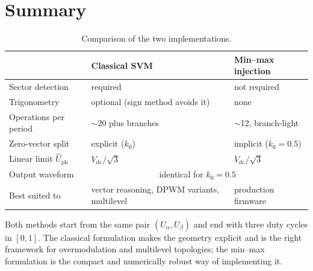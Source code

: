 \documentclass[11pt,a4paper]{article}
\newcommand{\vdc}{V_{\mathrm{dc}}}
\newcommand{\ualpha}{U_{\alpha}}
\newcommand{\ubeta}{U_{\beta}}
\begin{document}
\section{Summary}

\begin{table}[h]
\centering
\begin{tabular}{p{4.6cm}p{4.6cm}p{4.6cm}}
\toprule
& \textbf{Classical SVM} & \textbf{Min--max injection} \\
\midrule
Sector detection & required & not required \\
Trigonometry & optional (sign method avoids it) & none \\
Operations per period & $\sim$20 plus branches & $\sim$12, branch-light \\
Zero-vector split & explicit ($k_0$) & implicit ($k_0 = 0.5$) \\
Linear limit $\hat U_{\text{ph}}$ & $\vdc/\sqrt{3}$ & $\vdc/\sqrt{3}$ \\
Output waveform & \multicolumn{2}{c}{identical for $k_0 = 0.5$} \\
Best suited to & vector reasoning, DPWM variants, multilevel & production firmware \\
\bottomrule
\end{tabular}
\caption{Comparison of the two implementations.}
\end{table}

Both methods start from the same pair $(\ualpha, \ubeta)$ and end with three duty
cycles in $[0,1]$. The classical formulation makes the geometry explicit and is the
right framework for overmodulation and multilevel topologies; the min--max
formulation is the compact and numerically robust way of implementing it.
\end{document}
